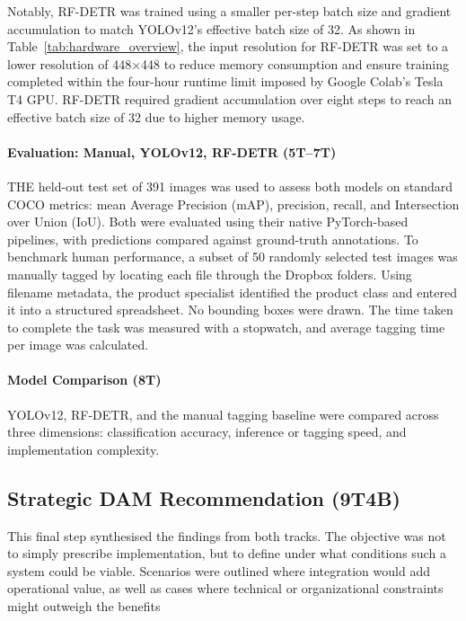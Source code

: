 \documentclass[a4paper,10pt,twocolumn]{article}
\numberwithin{figure}{section}
\numberwithin{table}{section}
\begin{document}
Notably, RF-DETR was 
trained using a smaller per-step batch size and gradient 
accumulation to match YOLOv12's effective batch size of 32.
As shown in Table~\ref{tab:hardware_overview}, the input resolution 
for RF-DETR was set to a lower resolution of 448×448 
to reduce memory consumption and ensure training 
completed within the four-hour runtime limit imposed by Google 
Colab’s Tesla T4 GPU. RF-DETR required gradient accumulation 
over eight steps to reach an effective batch size of 32 due to higher 
memory usage. 

\paragraph{Evaluation: Manual, YOLOv12, RF-DETR (5T–7T)}
THE held-out test set of 391 images was used to assess both models on
standard COCO metrics: mean Average Precision (mAP), precision, 
recall, and Intersection over Union (IoU). 
Both were evaluated using their native PyTorch-based pipelines, 
with predictions compared against ground-truth annotations.
To benchmark human performance, a subset of 50 randomly 
selected test images was manually tagged by locating 
each file through the Dropbox folders. 
Using filename metadata, the product specialist 
identified the product class and entered it into a 
structured spreadsheet. No bounding boxes were drawn. 
The time taken to complete the task was measured with a stopwatch, 
and average tagging time per image was calculated. 

\paragraph{Model Comparison (8T)}
YOLOv12, RF-DETR, and the manual tagging baseline
were compared across three dimensions: classification 
accuracy, inference or tagging speed, and implementation 
complexity.

\subsection{Strategic DAM Recommendation (9T4B)}
This final step synthesised the findings from both tracks.
The objective was not to simply prescribe implementation, but 
to define under what conditions such a system could be viable. 
Scenarios were outlined where integration would 
add operational value, as well as cases where technical 
or organizational constraints might outweigh the benefits
\end{document}
